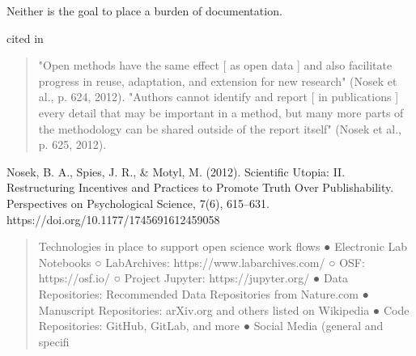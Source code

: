 Neither is the goal to place a burden of documentation.


\cite{perkel_democratic_2016} cited in \cite{national_open_2018}


\cite{burns_tacit_2021}

\begin{quote}
    "Open methods have the same effect [ as open data ] and also facilitate
    progress in reuse, adaptation, and extension for new research" (Nosek et al.,
    p. 624, 2012).
    "Authors cannot identify and report [ in publications ] every detail that may be
    important in a method, but many more parts of the methodology can be
    shared outside of the report itself" (Nosek et al., p. 625, 2012).
\end{quote}

Nosek, B. A., Spies, J. R., & Motyl, M. (2012). Scientific Utopia: II. Restructuring Incentives and Practices to Promote Truth
Over Publishability. Perspectives on Psychological Science, 7(6), 615–631. https://doi.org/10.1177/1745691612459058

\begin{quote}
    Technologies in place to support open science work flows
    ● Electronic Lab Notebooks
    ○ LabArchives: https://www.labarchives.com/
    ○ OSF: https://osf.io/
    ○ Project Jupyter: https://jupyter.org/
    ● Data Repositories: Recommended Data Repositories from Nature.com
    ● Manuscript Repositories: arXiv.org and others listed on Wikipedia
    ● Code Repositories: GitHub, GitLab, and more
    ● Social Media (general and specifi
\end{quote}









